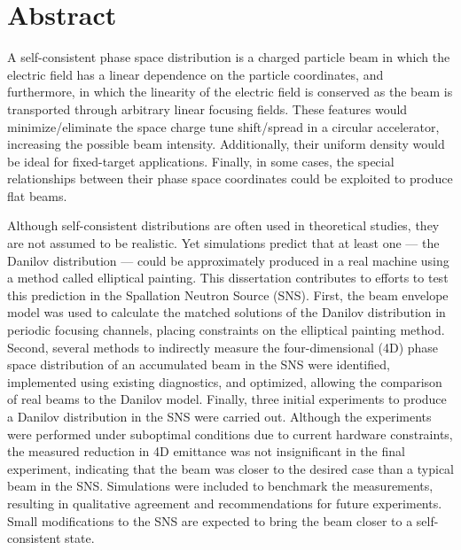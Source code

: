 \chapter*{Abstract} 

A self-consistent phase space distribution is a charged particle beam in which the electric field has a linear dependence on the particle coordinates, and furthermore, in which the linearity of the electric field is conserved as the beam is transported through arbitrary linear focusing fields. These features would minimize/eliminate the space charge tune shift/spread in a circular accelerator, increasing the possible beam intensity. Additionally, their uniform density would be ideal for fixed-target applications. Finally, in some cases, the special relationships between their phase space coordinates could be exploited to produce flat beams. 

Although self-consistent distributions are often used in theoretical studies, they are not assumed to be realistic. Yet simulations predict that at least one — the Danilov distribution — could be approximately produced in a real machine using a method called elliptical painting. This dissertation contributes to efforts to test this prediction in the Spallation Neutron Source (SNS). First, the beam envelope model was used to calculate the matched solutions of the Danilov distribution in periodic focusing channels, placing constraints on the elliptical painting method. Second, several methods to indirectly measure the four-dimensional (4D) phase space distribution of an accumulated beam in the SNS were identified, implemented using existing diagnostics, and optimized, allowing the comparison of real beams to the Danilov model. Finally, three initial experiments to produce a Danilov distribution in the SNS were carried out. Although the experiments were performed under suboptimal conditions due to current hardware constraints, the measured reduction in 4D emittance was not insignificant in the final experiment, indicating that the beam was closer to the desired case than a typical beam in the SNS. Simulations were included to benchmark the measurements, resulting in qualitative agreement and recommendations for future experiments. Small modifications to the SNS are expected to bring the beam closer to a self-consistent state.

